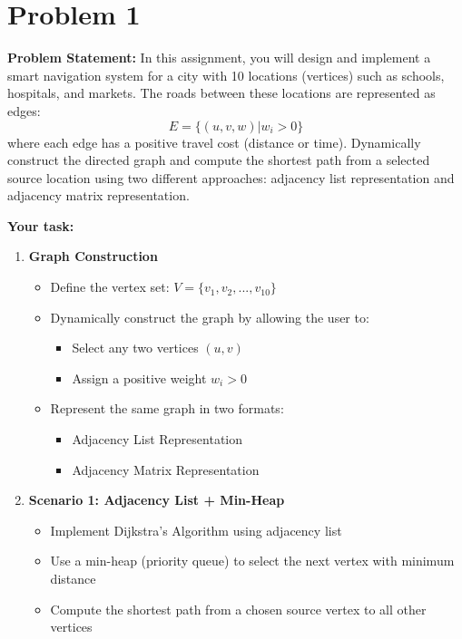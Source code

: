 \documentclass[a4paper,12pt]{article}
\begin{document}
\thispagestyle{firstpage}

\section*{Problem 1}
\textbf{Problem Statement:} In this assignment, you will design and implement a smart navigation system for a city with 10 locations (vertices) such as schools, hospitals, and markets. The roads between these locations are represented as edges:
$$E=\{(u,v,w)|w_{i}>0\}$$
where each edge has a positive travel cost (distance or time). Dynamically construct the directed graph and compute the shortest path from a selected source location using two different approaches: adjacency list representation and adjacency matrix representation.

\textbf{Your task:}
\begin{enumerate}
    \item \textbf{Graph Construction}
    \begin{itemize}
        \item Define the vertex set: $V=\{v_{1},v_{2},...,v_{10}\}$
        \item Dynamically construct the graph by allowing the user to:
        \begin{itemize}
            \item Select any two vertices $(u, v)$
            \item Assign a positive weight $w_{i}>0$
        \end{itemize}
        \item Represent the same graph in two formats:
        \begin{itemize}
            \item Adjacency List Representation
            \item Adjacency Matrix Representation
        \end{itemize}
    \end{itemize}
    \item \textbf{Scenario 1: Adjacency List + Min-Heap}
    \begin{itemize}
        \item Implement Dijkstra's Algorithm using adjacency list
        \item Use a min-heap (priority queue) to select the next vertex with minimum distance
        \item Compute the shortest path from a chosen source vertex to all other vertices
    \end{itemize}

\end{enumerate}
\end{document}
